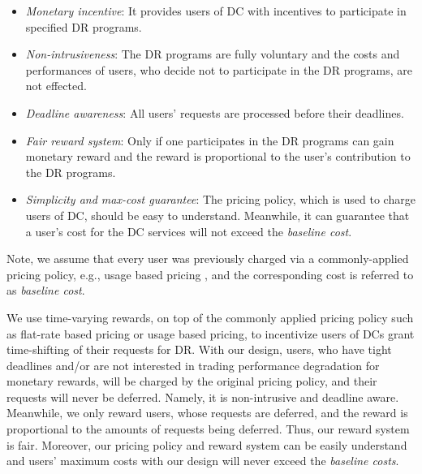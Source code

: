 \documentclass[conference]{IEEEtran}
\begin{document}
\begin{itemize}
\item \emph{Monetary incentive}: It provides users of DC with incentives to participate in specified DR programs.

\item \emph{Non-intrusiveness}: The DR programs are fully voluntary and the costs and performances of users, who decide not to participate in the DR programs, are not effected.

\item \emph{Deadline awareness}: All users' requests are processed before their deadlines.

\item \emph{Fair reward system}: Only if one participates in the DR programs can gain monetary reward and the reward is proportional to the user's contribution to the DR programs.

\item \emph{Simplicity and max-cost guarantee}: The pricing policy, which is used to charge users of DC, should be easy to understand. Meanwhile, it can guarantee that a user's cost for the DC services will not exceed the \emph{baseline cost}. 

\end{itemize}
Note, we assume that every user was previously charged via a commonly-applied pricing policy, e.g., usage based pricing \cite{Li2010}, and the corresponding cost is referred to as \emph{baseline cost}.


We use time-varying rewards, on top of the commonly applied pricing policy such as flat-rate based pricing or usage based pricing, to incentivize users of DCs grant time-shifting of their requests for DR. With our design, users, who have tight deadlines and/or are not interested in trading performance degradation for monetary rewards, will be charged by the original pricing policy, and their requests will never be deferred. Namely, it is non-intrusive and deadline aware. Meanwhile, we only reward users, whose requests are deferred, and the reward is proportional to the amounts of requests being deferred. Thus, our reward system is fair. Moreover, our pricing policy and reward system can be easily understand and users' maximum costs with our design will never exceed the \emph{baseline costs}.
\end{document}
